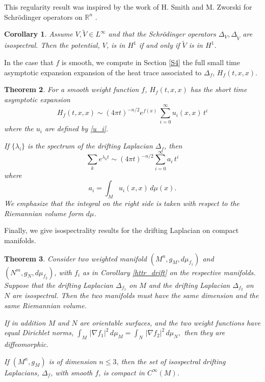\documentclass[letterpaper,12pt]{amsart}
\newtheorem{thm}{Theorem}[section]
\def \R{\mathbb R}
\def \n{\nabla}
\def \n{\nabla}
\def \eref{\eqref}
\newtheorem{cor}[thm]{Corollary}
\begin{document}
This regularity result was inspired by the work of H. Smith and M. Zworski for Schr\"odinger operators on $\R^n$ \cite{smith-z}.

\begin{cor} \label{cor-isosp}
Assume $V, \tilde{V}\in L^\infty$ and that the Schr\"odinger operators $\Delta_V, \Delta_{\tilde{V}}$ are isospectral. Then the potential, $V$, is in $H^1$ if and only if $\tilde{V}$ is in $H^1$.
\end{cor}

In the case that $f$ is smooth, we compute in Section \ref{S4} the full small time asymptotic expansion expansion of the heat trace associated to $\Delta_f$, $H_f(t,x,x)$.
\begin{thm} \label{thmhtr}
For a smooth weight function $f$, $H_f(t,x,x)$ has the short time asymptotic expansion
\begin{equation}  \label{htr1}
H_f(t,x,x) \sim (4 \pi t)^{-n/2} e^{f(x)} \,\sum_{i=0}^\infty u_i(x,x) \, t^i
\end{equation}
where the $u_i$ are defined by \eref{u_i}.

If $\{ \lambda_i\}$ is the spectrum of the drifting Laplacian $\Delta_f$, then
\begin{equation} \label{htr2}
\sum_k e^{\lambda_k t} \sim (4 \pi t)^{-n/2} \sum_{i=0}^\infty a_i \, t^i
\end{equation}
where
\[
a_i = \int_M u_i(x,x) \, d\mu(x).
\]
We emphasize that the integral on the right side is taken with respect to the Riemannian volume form $d\mu$.
\end{thm}


Finally, we give isospectrality results for the drifting Laplacian on compact manifolds.
\begin{thm} \label{isosp}
Consider two weighted  manifold $(M^n, g_M, d\mu_{f_1} )$ and $(N^m, g_N, d\mu_{f_2})$, with $f_i$ as in Corollary \ref{httr_drift} on the respective manifolds. Suppose that the drifting Laplacian $\Delta_{f_1}$ on $M$ and the drifting Laplacian $\Delta_{f_2}$ on $N$  are isospectral. Then the two manifolds must have the same dimension and the same Riemannian volume.

If in addition $M$ and $N$ are orientable surfaces, and the two weight functions have equal Dirichlet norms, $\int_M  \, |\n f_1 |^2  \, d\mu_M = \int_N  \, |\n f_2 |^2  \, d\mu_N,$ then they are diffeomorphic.

If $(M^n, g_M)$ is of dimension $n \leq 3$, then the set of isospectral drifting Laplacians, $\Delta_f$, with smooth $f$, is compact in $C^\infty (M)$.
\end{thm}
\end{document}
